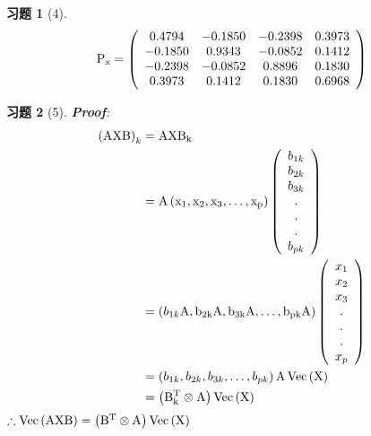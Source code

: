 \documentclass[12pt, oneside]{article}
\newtheorem*{exercise}{\textbf{习题}}
\begin{document}
  \begin{exercise}[4]
	\scriptsize
	\begin{equation*}
	  \rm{
		P_x = \left(
		\begin{array}{cccc}
		  0.4794 & -0.1850 & -0.2398 & 0.3973 \\
		  -0.1850 & 0.9343 & -0.0852 & 0.1412 \\
		  -0.2398 & -0.0852 & 0.8896 & 0.1830 \\
		  0.3973 & 0.1412 & 0.1830 & 0.6968 \\
		\end{array}
		\right)
	  }
	\end{equation*}
  \end{exercise}

  \begin{exercise}[5]
	\rm{
	  \textbf{Proof}:\\
	  \begin{equation*}
		\begin{aligned}
		  \left( \rm{AXB} \right)_k &= \rm{AXB}_k \\
		  &= \rm{A} \left( x_1, x_2, x_3, \dots , x_p \right)
		  \left(
		  \begin{array}{c}
			b_{1k} \\
			b_{2k} \\
			b_{3k} \\
			. \\
			. \\
			. \\
			b_{pk} \\
		  \end{array}
		  \right) \\
		  &= \left( b_{1k}\rm{A}, b_{2k}\rm{A}, b_{3k}\rm{A}, \dots , b_{pk}\rm{A}\right) \left( 
		  \begin{array}{c}
			x_1 \\
			x_2 \\
			x_3 \\
			. \\
			. \\
			. \\
			x_p \\
		  \end{array}
		  \right) \\
		  &= \left( b_{1k}, b_{2k}, b_{3k}, \dots , b_{pk}\right)\rm{A}\operatorname{Vec}\left( \rm{X} \right) \\
		  &= \left( \rm{B}_k^T \otimes \rm{A} \right) \operatorname{Vec} \left( \rm{X} \right) 
		\end{aligned} 
	  \end{equation*}
	  $\therefore \operatorname{Vec}\left( \rm{AXB} \right)	= \left( \rm{B}^T \otimes \rm{A} \right) \operatorname{Vec} \left( \rm{X} \right)$
	}
  \end{exercise}
\end{document}
